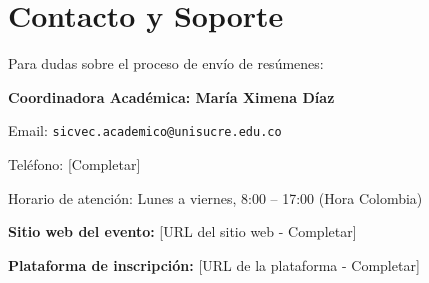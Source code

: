 \documentclass[12pt,a4paper]{article}
\begin{document}
\section{Contacto y Soporte}

Para dudas sobre el proceso de envío de resúmenes:

\begin{tcolorbox}[cajainfo, title=Contacto Académico]
\textbf{Coordinadora Académica: María Ximena Díaz}

Email: \texttt{sicvec.academico@unisucre.edu.co}

Teléfono: [Completar]

Horario de atención: Lunes a viernes, 8:00 -- 17:00 (Hora Colombia)
\end{tcolorbox}

\vspace{0.5cm}

\textbf{Sitio web del evento:} [URL del sitio web - Completar]

\textbf{Plataforma de inscripción:} [URL de la plataforma - Completar]
\end{document}
